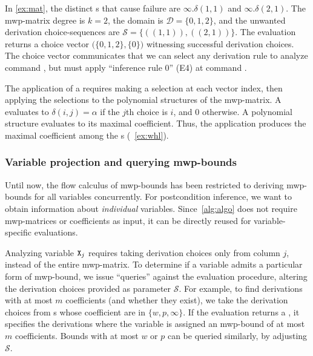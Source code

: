 \begin{example}\label{ex:derivable}
In \autoref{ex:mat}, the distinct s that cause failure are \(\infty.\delta(1,1)\) and  \(\infty.\delta(2,1)\).
The mwp-matrix degree is \(k=2\), the domain is \(\mathcal{D}=\{0,1,2\}\), and the unwanted derivation choice-sequences are \(\mathcal{S} = \{ ((1,1)), ((2,1)) \}\).
The evaluation returns a choice vector \(\big(\{0,1,2\}, \{0\}\big)\) witnessing successful derivation choices.
The choice vector communicates that we can select any derivation rule to analyze command , but must apply \enquote{inference rule 0} (E4) at command .
\end{example}

The application of a  requires making a selection at each vector index, then applying the selections to the polynomial structures of the mwp-matrix.
A  evaluates to \(\delta(i, j) = \alpha\) if the \(j\)th choice is \(i\), and \(0\) otherwise.
A polynomial structure evaluates to its maximal coefficient.
Thus, the application produces the maximal coefficient among the s (\cf~\autoref{ex:whl}).

\subsubsection{Variable projection and querying mwp-bounds}
\label{subsec:query}

Until now, the flow calculus of mwp-bounds has been restricted to deriving mwp-bounds for all variables concurrently.
For postcondition inference, we want to obtain information about \emph{individual} variables.
Since~\autoref{alg:algo} does not require mwp-matrices or coefficients as input, it can be directly reused for variable-specific evaluations.

Analyzing variable \(\prm{X}_j\) requires taking derivation choices only from column \(j\), instead of the entire mwp-matrix.
To determine if a variable admits a particular form of mwp-bound, we issue \enquote{queries} against the evaluation procedure,
altering the derivation choices provided as parameter \(\mathcal{S}\).
For example, to find derivations with at most \(m\) coefficients (and whether they exist), we take the derivation choices from s whose coefficient are in \(\{w, p,\infty\}\).
If the evaluation returns a , it specifies the derivations where the variable is assigned an mwp-bound of at most \(m\) coefficients.
Bounds with at most \(w\) or \(p\) can be queried similarly, by adjusting \(\mathcal{S}\).

